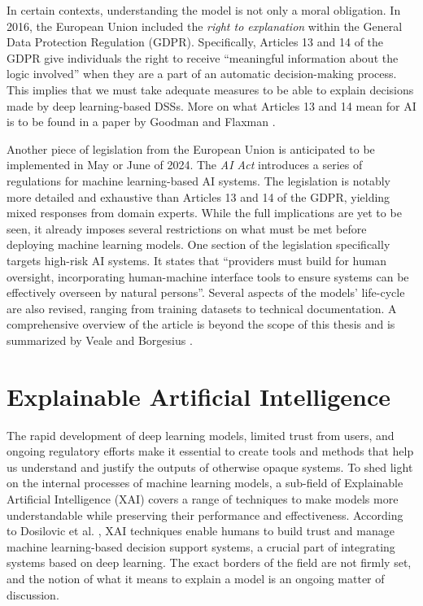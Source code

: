In certain contexts, understanding the model is not only a moral obligation.
In 2016, the European Union included the \emph{right to explanation} within the General Data Protection Regulation (GDPR).
Specifically, Articles 13 and 14 of the GDPR give individuals the right to receive ``meaningful information about the logic involved'' when they are a part of an automatic decision-making process.
This implies that we must take adequate measures to be able to explain decisions made by deep learning-based DSSs.
More on what Articles 13 and 14 mean for AI is to be found in a paper by Goodman and Flaxman \cite{xai-gdpr}.

Another piece of legislation from the European Union is anticipated to be implemented in May or June of 2024.
The \emph{AI Act} introduces a series of regulations for machine learning-based AI systems.
The legislation is notably more detailed and exhaustive than Articles 13 and 14 of the GDPR, yielding mixed responses from domain experts.
While the full implications are yet to be seen, it already imposes several restrictions on what must be met before deploying machine learning models.
One section of the legislation specifically targets high-risk AI systems.
It states that ``providers must build for human oversight, incorporating human-machine interface tools to ensure systems can be effectively overseen by natural persons''.
Several aspects of the models' life-cycle are also revised, ranging from training datasets to technical documentation.
A comprehensive overview of the article is beyond the scope of this thesis and is summarized by Veale and Borgesius \cite{xai-ai-act}.

\section{Explainable Artificial Intelligence}

The rapid development of deep learning models, limited trust from users, and ongoing regulatory efforts make it essential to create tools and methods that help us understand and justify the outputs of otherwise opaque systems.
To shed light on the internal processes of machine learning models, a sub-field of Explainable Artificial Intelligence (XAI) covers a range of techniques to make models more understandable while preserving their performance and effectiveness.
According to Dosilovic et al. \cite{xai-survey}, XAI techniques enable humans to build trust and manage machine learning-based decision support systems, a crucial part of integrating systems based on deep learning.
The exact borders of the field are not firmly set, and the notion of what it means to explain a model is an ongoing matter of discussion.

